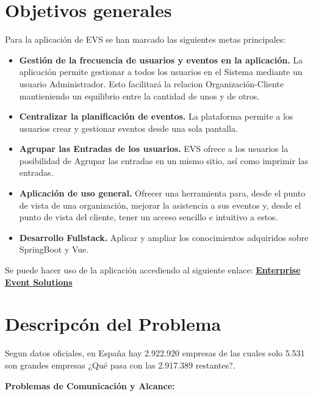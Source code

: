 
\section{Objetivos generales}

Para la aplicación de EVS se han marcado las siguientes metas principales:
\begin{itemize}
    \item \textbf{Gestión de la frecuencia de usuarios y eventos en la aplicación.} La aplicación permite gestionar a todos los usuarios en el Sistema
    mediante un usuario Administrador. Esto facilitará la relacion Organización-Cliente mantieniendo un equilibrio entre la cantidad de unos y de otros.
    \item \textbf{Centralizar la planificación de eventos.} La plataforma permite a los usuarios crear y gestionar eventos desde una sola pantalla.
    \item \textbf{Agrupar las Entradas de los usuarios.}  EVS ofrece a los usuarios la posibilidad de Agrupar las entradas en un mismo sitio, así como imprimir las entradas.
    \item \textbf{Aplicación de uso general.} Ofrecer una herramienta para, desde el punto de vista de una organización, mejorar la asistencia a sus eventos
    y, desde el punto de vista del cliente, tener un acceso sencillo e intuitivo a estos.
    \item \textbf{Desarrollo Fullstack.} Aplicar y ampliar los conocimientos adquiridos sobre SpringBoot y Vue.
    \end{itemize}
    Se puede hacer uso de la aplicación accediendo al siguiente enlace: \textbf{\href{https://18.133.60.104:8443/}{Enterprise Event Solutions}}

\section{Descripcón del Problema}
Segun datos oficiales, en España hay 2.922.920 empresas de las cuales solo  5.531 son grandes empresas \cite{pymes} ¿Qué pasa con las 2.917.389 restantes?.

\textbf{Problemas de Comunicación y Alcance:}

